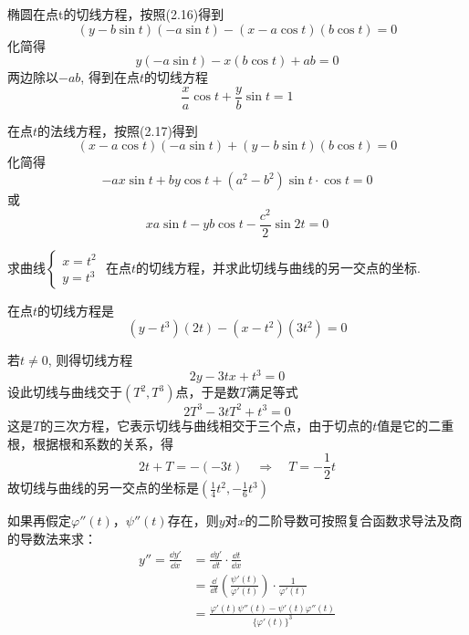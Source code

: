\begin{solution}
椭圆在点t的切线方程，按照(2.16)得到
\[(y-b\sin t) (-a\sin t )-(x-a\cos t)(b\cos t)=0\]
    化简得
 \[   y ( - a\sin t) - x(b\cos t)+ab=0\]
    两边除以$-ab$, 得到在点$t$的切线方程
\[\frac{x}{a}\cos t+\frac{y}{b}\sin t=1\]

在点$t$的法线方程，按照(2.17)得到
\[(x-a\cos t) (-a\sin t)+(y-b\sin t)(b\cos t)=0\]
    化简得
\[   -ax\sin t+by\cos t+ (a^2-b^2) \sin t\cdot \cos t=0\]
    或
    \[xa\sin t-yb\cos t-\frac{c^2}{2}\sin 2t=0\]
\end{solution}    

\begin{example}
    求曲线$\begin{cases}
        x=t^2\\y=t^3
    \end{cases}$
    在点$t$的切线方程，并求此切线与曲线的另一交点的坐标.
\end{example}

\begin{solution}
在点$t$的切线方程是
\[(y-t^3)(2t)-(x-t^2)(3t^2)=0\]

若$t\ne 0$, 则得切线方程
  \[  2y-3tx+t^3=0\]
    设此切线与曲线交于$(T^2,T^3)$点，于是数$T$满足等式
   \[ 2T^3-3tT^2+t^3=0\]
    这是$T$的三次方程，它表示切线与曲线相交于三个点，由于切点的$t$值是它的二重根，根据根和系数的关系，得
\[2t+T=-(-3t)\quad \Rightarrow\quad T=-\frac{1}{2}t\]
故切线与曲线的另一交点的坐标是$\left(\frac{1}{4}t^2,-\frac{1}{6}t^3\right)$

如果再假定$\varphi''(t)$，$\psi''(t)$存在，则$y$对$x$的二阶导数可按照复合函数求导法及商的导数法来求：
\[\begin{split}
    y''=\frac{\dd y'}{\dd x}&=\frac{\dd y'}{\dd t}\cdot \frac{\dd t}{\dd x}\\
    &=\frac{\dd }{\dd t}\left(\frac{\psi'(t)}{\varphi'(t)}\right)\cdot \frac{1}{\varphi'(t)}\\
    &=\frac{\varphi'(t)\psi''(t)-\psi'(t)\varphi''(t)}{\big\{\varphi'(t)\big\}^3}
\end{split}\]
\end{solution}

